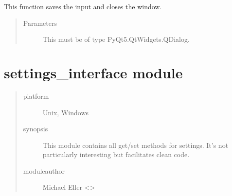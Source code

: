 \documentclass[letterpaper,10pt,english]{sphinxmanual}
\begin{document}
\begin{fulllineitems}
\begin{fulllineitems}
\end{fulllineitems}


\begin{fulllineitems}
\label{\detokenize{windowFilterGUI:windowFilterGUI.Ui_Dialog.save}}
This function saves the input and closes the window.
\begin{quote}\begin{description}
\item[{Parameters}] \leavevmode
{} \textendash{} This must be of type PyQt5.QtWidgets.QDialog.

\end{description}\end{quote}

\end{fulllineitems}


\end{fulllineitems}



\section{settings\_interface module}
\label{\detokenize{settings_interface:module-settings_interface}}\label{\detokenize{settings_interface:settings-interface-module}}\label{\detokenize{settings_interface::doc}}\begin{quote}\begin{description}
\item[{platform}] \leavevmode
Unix, Windows

\item[{synopsis}] \leavevmode
This module contains all get/set methods for settings.
It’s not particularly interesting but facilitates clean code.

\item[{moduleauthor}] \leavevmode
Michael Eller \textless{}\textgreater{}

\end{description}\end{quote}
\end{document}
